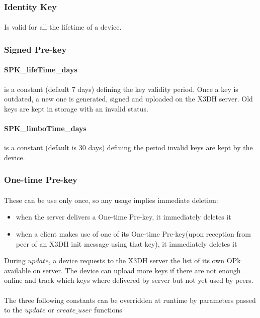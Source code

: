 \documentclass[a4paper,11pt]{article}
\begin{document}
    \subsubsection{Identity Key}
      \paragraph{}Is valid for all the lifetime of a device.
    
    \subsubsection{Signed Pre-key}
      \paragraph*{SPK\_lifeTime\_days}is a constant (default 7 days) defining the key validity period. Once a key is outdated, a new one is generated, signed and uploaded on the X3DH server. Old keys are kept in storage with an invalid status.
      \paragraph*{SPK\_limboTime\_days}is a constant (default is 30 days) defining the period invalid keys are kept by the device.
       
    \subsubsection{One-time Pre-key}
      \paragraph{}These can be use only once, so any usage implies immediate deletion:
      \begin{itemize}
      \item when the server delivers a One-time Pre-key, it immediately deletes it
      \item when a client makes use of one of its One-time Pre-key(upon reception from peer of an X3DH init message using that key), it immediately deletes it
      \end{itemize}
      During $update$, a device requests to the X3DH server the list of its own OPk available on server. The device can upload more keys if there are not enough online and track which keys where delivered by server but not yet used by peers.
      \paragraph{}The three following constants can be overridden at runtime by parameters passed to the $update$ or $create\_user$ functions
\end{document}
